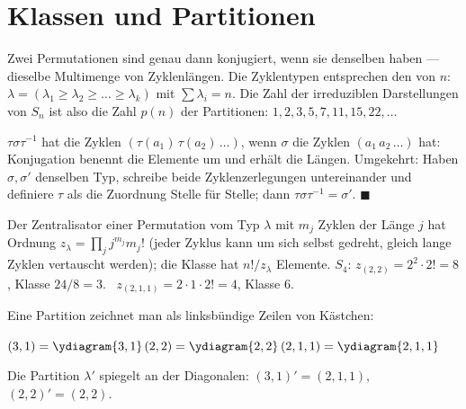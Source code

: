 \begin{merksatz}
\begin{center}
\begin{minipage}{0.88\textwidth}
\end{minipage}
\end{center}
\end{merksatz}

\section{Klassen und Partitionen}

\begin{merksatz}
Zwei Permutationen sind genau dann konjugiert, wenn sie denselben  haben --- dieselbe Multimenge von Zyklenlängen. Die Zyklentypen entsprechen den  von $n$: $\lambda = (\lambda_1\ge\lambda_2\ge\dots\ge\lambda_k)$ mit $\sum\lambda_i = n$. Die Zahl der irreduziblen Darstellungen von $S_n$ ist also die Zahl $p(n)$ der Partitionen: $1, 2, 3, 5, 7, 11, 15, 22, \dots$

$\tau\sigma\tau^{-1}$ hat die Zyklen $(\tau(a_1)\,\tau(a_2)\,\dots)$, wenn $\sigma$ die Zyklen $(a_1\,a_2\,\dots)$ hat: Konjugation benennt die Elemente um und erhält die Längen. Umgekehrt: Haben $\sigma, \sigma'$ denselben Typ, schreibe beide Zyklenzerlegungen untereinander und definiere $\tau$ als die Zuordnung Stelle für Stelle; dann $\tau\sigma\tau^{-1} = \sigma'$. $\blacksquare$

Der Zentralisator einer Permutation vom Typ $\lambda$ mit $m_j$ Zyklen der Länge $j$ hat Ordnung $z_\lambda = \prod_jj^{m_j}m_j!$ (jeder Zyklus kann um sich selbst gedreht, gleich lange Zyklen vertauscht werden); die Klasse hat $n!/z_\lambda$ Elemente. $S_4$: $z_{(2,2)} = 2^{2}\cdot2! = 8$, Klasse $24/8 = 3$. \checkmark\ $z_{(2,1,1)} = 2\cdot1\cdot2! = 4$, Klasse $6$. \checkmark

Eine Partition zeichnet man als linksbündige Zeilen von Kästchen:
\begin{center}
$(3, 1) = \ydiagram{3,1}$\qquad $(2, 2) = \ydiagram{2,2}$\qquad $(2, 1, 1) = \ydiagram{2,1,1}$
\end{center}
Die  Partition $\lambda'$ spiegelt an der Diagonalen: $(3, 1)' = (2, 1, 1)$, $(2, 2)' = (2, 2)$.
\end{merksatz}

